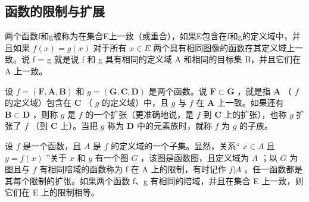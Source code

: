 \subsection{函数的限制与扩展}

两个函数f和g被称为在集合E上一致（或重合），如果E包含在f和g的定义域中，并且如果 \(f(x) = g(x)\) 对于所有 \(x \in E\) 两个具有相同图像的函数在其定义域上一致。说 f = g 就是说 f 和 g 具有相同的定义域 A 和相同的目标集 B，并且它们在 A 上一致。

设 \(f = (\mathbf{F}, \mathbf{A}, \mathbf{B})\) 和 \(g = (\mathbf{G}, \mathbf{C}, \mathbf{D})\) 是两个函数。说 \(\mathbf{F} \subset \mathbf{G}\) ，就是指 \(\mathbf{A}\) （ \(f\) 的定义域）包含在 \(\mathbf{C}\) （ \(g\) 的定义域）中，且 \(g\) 与 \(f\) 在 \(\mathbf{A}\) 上一致。如果还有 \(\mathbf{B} \subset \mathbf{D}\) ，则称 \(g\) 是 \(f\) 的一个扩张（更准确地说，是 \(f\) 到 \(\mathbf{C}\) 上的扩张），也称 \(g\) 扩张了 \(f\) （到 \(\mathbf{C}\) 上）。当把 \(g\) 称为 \(\mathbf{D}\) 中的元素族时，就称 \(f\) 为 \(g\) 的子族。

设 \(f\) 是一个函数，且 \(A\) 是 \(f\) 的定义域的一个子集。显然，关系“ \(x \in A\) 且 \(y = f(x)\) ”关于 \(x\) 和 \(y\) 有一个图 \(G\) ，该图是函数图，且定义域为 \(A\) ；以 \(G\) 为图且与 \(f\) 有相同陪域的函数称为 f 在 A 上的限制，有时记作 \(f|A\) 。任一函数都是其每个限制的扩张。如果两个函数 f、g 有相同的陪域，并且在集合 E 上一致，则它们在 E 上的限制相等。

